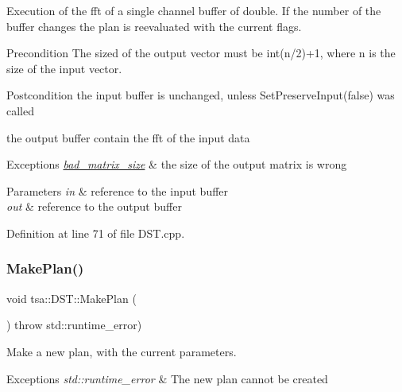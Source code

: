 Execution of the fft of a single channel buffer of double. If the number of the buffer changes the plan is reevaluated with the current flags.

\begin{DoxyPrecond}{Precondition}
The sized of the output vector must be int(n/2)+1, where n is the size of the input vector.
\end{DoxyPrecond}
\begin{DoxyPostcond}{Postcondition}
the input buffer is unchanged, unless Set\+Preserve\+Input(false) was called 

the output buffer contain the fft of the input data
\end{DoxyPostcond}

\begin{DoxyExceptions}{Exceptions}
{\em \hyperlink{classtsa_1_1bad__matrix__size}{bad\+\_\+matrix\+\_\+size}} & the size of the output matrix is wrong \\
\hline
\end{DoxyExceptions}

\begin{DoxyParams}{Parameters}
{\em in} & reference to the input buffer \\
\hline
{\em out} & reference to the output buffer \\
\hline
\end{DoxyParams}


Definition at line 71 of file D\+S\+T.\+cpp.

\mbox{\label{classtsa_1_1_d_s_t_a066a93f3ddbf56f8e5c67067156ebb9a}} 
\subsubsection{\texorpdfstring{Make\+Plan()}{MakePlan()}}
{\footnotesize\ttfamily void tsa\+::\+D\+S\+T\+::\+Make\+Plan (\begin{DoxyParamCaption}{ }\end{DoxyParamCaption}) throw  std\+::runtime\+\_\+error) \hspace{0.3cm}{\ttfamily [virtual]}}

Make a new plan, with the current parameters.


\begin{DoxyExceptions}{Exceptions}
{\em std\+::runtime\+\_\+error} & The new plan cannot be created \\
\hline
\end{DoxyExceptions}



